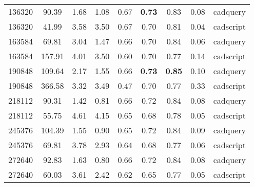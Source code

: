 \begin{table}[ht]
\begin{tabular}{c c c c c c c c c}
		136320              & 90.39                  & 1.68                   & 1.08                    & 0.67                    & \textbf{0.73}           & 0.83                     & 0.08                  & cadquery        \\
		136320              & 41.99                  & 3.58                   & 3.50                    & 0.67                    & 0.70                    & 0.81                     & 0.04                  & cadscript       \\
		163584              & 69.81                  & 3.04                   & 1.47                    & 0.66                    & 0.70                    & 0.84                     & 0.06                  & cadquery        \\
		163584              & 157.91                 & 4.01                   & 3.50                    & 0.60                    & 0.70                    & 0.77                     & 0.14                  & cadscript       \\
		190848              & 109.64                 & 2.17                   & 1.55                    & 0.66                    & \textbf{0.73}           & \textbf{0.85}            & 0.10                  & cadquery        \\
		190848              & 366.58                 & 3.32                   & 3.49                    & 0.47                    & 0.70                    & 0.77                     & 0.33                  & cadscript       \\
		218112              & 90.31                  & 1.42                   & 0.81                    & 0.66                    & 0.72                    & 0.84                     & 0.08                  & cadquery        \\
		218112              & 55.75                  & 4.61                   & 4.15                    & 0.65                    & 0.68                    & 0.78                     & 0.05                  & cadscript       \\
		245376              & 104.39                 & 1.55                   & 0.90                    & 0.65                    & 0.72                    & 0.84                     & 0.09                  & cadquery        \\
		245376              & 69.81                  & 3.78                   & 2.93                    & 0.64                    & 0.68                    & 0.77                     & 0.06                  & cadscript       \\
		272640              & 92.83                  & 1.63                   & 0.80                    & 0.66                    & 0.72                    & 0.84                     & 0.08                  & cadquery        \\
		272640              & 60.03                  & 3.61                   & 2.42                    & 0.62                    & 0.65                    & 0.77                     & 0.05                  & cadscript       \\
		\hline
	\end{tabular}
\end{table}

